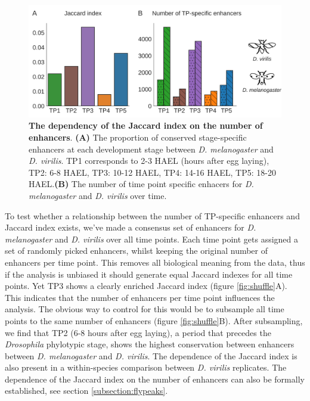 \begin{figure}[H]
    \includegraphics[width=\linewidth]{ch.hourglass/images/enhancers_between.png}
    \caption{\textbf{The dependency of the Jaccard index on the number of enhancers}. \textbf{(A)} The proportion of conserved stage-specific enhancers at each development stage between \textit{D. melanogaster} and \textit{D. virilis}. TP1 corresponds to 2-3 HAEL (hours after egg laying), TP2: 6-8 HAEL, TP3: 10-12 HAEL, TP4: 14-16 HAEL, TP5: 18-20 HAEL.\textbf{(B)} The number of time point specific enhacers for \textit{D. melanogaster} and \textit{D. virilis} over time. }
    \label{fig:peak_between}
\end{figure}

To test whether a relationship between the number of TP-specific enhancers and Jaccard index exists, we've made a consensus set of enhancers for \textit{D. melanogaster} and \textit{D. virilis} over all time points. Each time point gets assigned a set of randomly picked enhancers, whilst keeping the original number of enhancers per time point. This removes all biological meaning from the data, thus if the analysis is unbiased it should generate equal Jaccard indexes for all time points. Yet TP3 shows a clearly enriched Jaccard index (figure \ref{fig:shuffle}A). This indicates that the number of enhancers per time point influences the analysis. The obvious way to control for this would be to subsample all time points to the same number of enhancers (figure \ref{fig:shuffle}B). After subsampling, we find that TP2 (6-8 hours after egg laying), a period that precedes the \textit{Drosophila} phylotypic stage\cite{Kalinka2010,Liu2020}, shows the highest conservation between enhancers between \textit{D. melanogaster} and \textit{D. virilis}. The dependence of the Jaccard index is also present in a within-species comparison between \textit{D. virilis} replicates. The dependence of the Jaccard index on the number of enhancers can also be formally established, see section \ref{subsection:flypeaks}.

